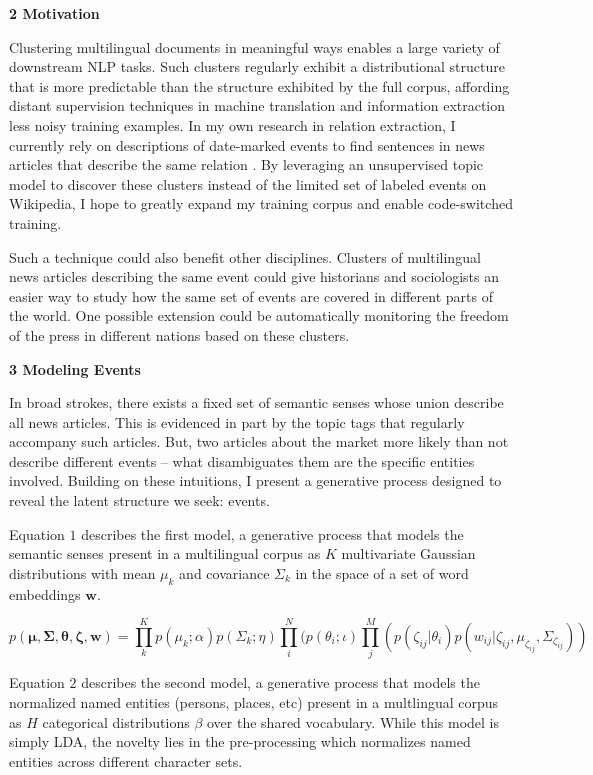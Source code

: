 \documentclass[12pt]{article}
\begin{document}
\textbf{2 Motivation}

Clustering multilingual documents in meaningful ways enables a large variety of downstream NLP tasks.  Such clusters regularly exhibit a distributional structure that is more predictable than the structure exhibited by the full corpus, affording distant supervision techniques in machine translation and information extraction less noisy training examples.  In my own research in relation extraction, I currently rely on descriptions of date-marked events to find sentences in news articles that describe the same relation \cite{ananthram2020event}.  By leveraging an unsupervised topic model to discover these clusters instead of the limited set of labeled events on Wikipedia, I hope to greatly expand my training corpus and enable code-switched training.

Such a technique could also benefit other disciplines.  Clusters of multilingual news articles describing the same event could give historians and sociologists an easier way to study how the same set of events are covered in different parts of the world.   One possible extension could be automatically monitoring the freedom of the press in different nations based on these clusters.

\textbf{3 Modeling Events}

In broad strokes, there exists a fixed set of semantic senses whose union describe all news articles.  This is evidenced in part by the topic tags that regularly accompany such articles.  But, two articles about the market more likely than not describe different events -- what disambiguates them are the specific entities involved.  Building on these intuitions, I present a generative process designed to reveal the latent structure we seek: events.

Equation $1$ describes the first model, a generative process that models the semantic senses present in a multilingual corpus as $K$ multivariate Gaussian distributions with mean $\mu_k$ and covariance $\Sigma_k$ in the space of a set of word embeddings $\bm{w}$. 

\begin{equation}
p(\bm{\mu}, \bm{\Sigma}, \bm{\theta}, \bm{\zeta}, \bm{w}) = \prod^{K}_{k} p(\mu_k; \alpha)p(\Sigma_k;\eta)\prod^N_{i}(p(\theta_i;\iota)\prod^M_{j}(p(\zeta_{ij} | \theta_i)p(w_{ij} | \zeta_{ij}, \mu_{\zeta_{ij}}, \Sigma_{\zeta_{ij}}))
\end{equation}

Equation $2$ describes the second model, a generative process that models the normalized named entities (persons, places, etc) present in a multlingual corpus as $H$ categorical distributions $\beta$ over the shared vocabulary.  While this model is simply LDA, the novelty lies in the pre-processing which normalizes named entities across different character sets.
\end{document}
